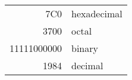 \documentclass{article}
\begin{document}
              \begin{tabular}{|r|l|}
              \hline
                     7C0 & hexadecimal \\
                     3700 & octal \\ \cline{2-2}
                     11111000000 & binary \\
                     \hline \hline
                     1984 & decimal \\
                     \hline
              \end{tabular}
   
\end{document}
